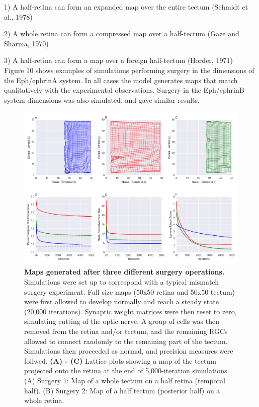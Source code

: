 \documentclass[11pt]{"article"}
\begin{document}
1) A half-retina can form an expanded map over the entire tectum (Schmidt et al., 1978)

2) A whole retina can form a compressed map over a half-tectum (Gaze and Sharma, 1970)

3) A half-retina can form a map over a foreign half-tectum (Horder, 1971)\\

Figure 10 shows examples of simulations performing surgery in the dimensions of the Eph/ephrinA system. In all cases the model generates maps that match qualitatively with the experimental observations. Surgery in the Eph/ephrinB system dimensions was also simulated, and gave similar results.


\pagebreak
\begin{figure}[!h]
\includegraphics[scale=0.55]{SurgeryPlot}
\caption{\textbf{Maps generated after three different surgery operations.} Simulations were set up to correspond with a typical mismatch surgery experiment. Full size maps (50x50 retina and 50x50 tectum) were first allowed to develop normally and reach a steady state (20,000 iterations). Synaptic weight matrices were then reset to zero, simulating cutting of the optic nerve. A group of cells was then removed from the retina and/or tectum, and the remaining RGCs allowed to connect randomly to the remaining part of the tectum. Simulations then proceeded as normal, and precision measures were follwed. 
\textbf{(A) - (C)} Lattice plots showing a map of the tectum projected onto the retina at the end of 5,000-iteration simulations.
(A) Surgery 1: Map of a whole tectum on a half retina (temporal half).
(B) Surgery 2: Map of a half tectum (posterior half) on a whole retina.
}
\end{figure}
\end{document}
